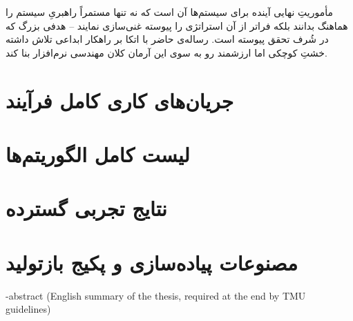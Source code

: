 \documentclass[oneside,openany,phd]{TMU-Thesis}
\begin{document}
مأموریتِ نهایی آینده برای سیستم‌ها آن است که نه تنها مستمراً راهبریِ سیستم را هماهنگ بدانند بلکه فراتر از آن استراتژی را پیوسته غنی‌سازی نمایند – هدفی بزرگ که در شُرف تحقق پیوسته است. رساله‌ی حاضر با اتکا بر راهکار ابداعی  تلاش داشته خشتِ کوچکی اما ارزشمند رو به سوی این آرمان کلان مهندسی نرم‌افزار بنا کند.

\newpage

\pagestyle{empty}
{
\onehalfspacing


}

\pagestyle{fancy}
\appendix
\chapter{جریان‌های کاری کامل فرآیند}
\newpage
\chapter{لیست کامل الگوریتم‌ها}
\newpage
\chapter{نتایج تجربی گسترده}
\newpage
\chapter{مصنوعات پیاده‌سازی و پکیج بازتولید}

\newpage

\en-abstract{
(English summary of the thesis, required at the end by TMU guidelines)
}
\latinfirstPage
\end{document}

